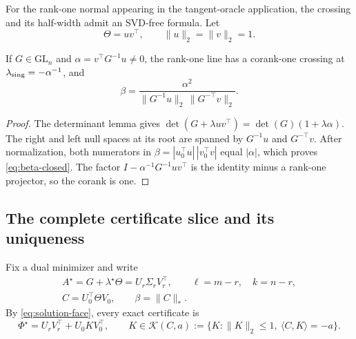 For the rank-one normal appearing in the tangent-oracle application, the
crossing and its half-width admit an SVD-free formula.  Let
\begin{equation}
 \Theta=uv^\top,
 \qquad \|u\|_2=\|v\|_2=1.
 \label{eq:rank-one-normal}
\end{equation}

\begin{proposition}
\label{prop:beta-closed}
If \(G\in\mathrm{GL}_n\) and
\(\alpha=v^\top G^{-1}u\ne0\), the rank-one line has a corank-one crossing at
\(\lambda_{\rm sing}=-\alpha^{-1}\), and
\begin{equation}
 \beta=
 \frac{\alpha^2}
 {\|G^{-1}u\|_2\,\|G^{-\top}v\|_2}.
 \label{eq:beta-closed}
\end{equation}
\end{proposition}

\begin{proof}
The determinant lemma gives
\(\det(G+\lambda uv^\top)=\det(G)(1+\lambda\alpha)\).  The right and left
null spaces at its root are spanned by \(G^{-1}u\) and \(G^{-\top}v\).
After normalization, both numerators in
\(\beta=|u_0^\top u|\,|v_0^\top v|\) equal \(|\alpha|\), which proves
\eqref{eq:beta-closed}.  The factor
\(I-\alpha^{-1}G^{-1}uv^\top\) is the identity minus a rank-one projector,
so the corank is one.
\end{proof}

\subsection{The complete certificate slice and its uniqueness}

Fix a dual minimizer and write
\[
 \begin{gathered}
 A^\star=G+\lambda^\star\Theta=U_r\Sigma_rV_r^\top,
 \qquad \ell=m-r,\quad k=n-r,\\
 C=U_0^\top\Theta V_0,\qquad \beta=\|C\|_*.
 \end{gathered}
\]
By \eqref{eq:solution-face}, every exact certificate is
\begin{equation}
 \Phi^\star=U_rV_r^\top+U_0KV_0^\top,
 \qquad
 K\in\mathcal K(C,a):=
 \{K:\|K\|_2\le1,\ \langle C,K\rangle=-a\}.
 \label{eq:all-directions}
\end{equation}

